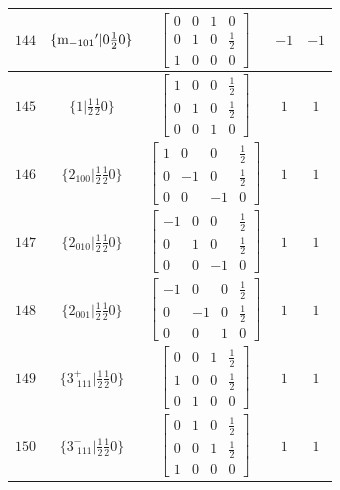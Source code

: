 \documentclass[fleqn,8pt]{jsarticle}
\begin{document}
\begin{longtable}{ccccc}
$ 144 $ & $ \{{\rm m}_{-101}{}'|0 \frac{1}{2} 0\} $ & $ \begin{bmatrix} 0 & 0 & 1 & 0 \\ 0 & 1 & 0 & \frac{1}{2} \\ 1 & 0 & 0 & 0 \end{bmatrix} $ & $ -1 $ & $ -1 $ \\ \hline
$ 145 $ & $ \{1|\frac{1}{2} \frac{1}{2} 0\} $ & $ \begin{bmatrix} 1 & 0 & 0 & \frac{1}{2} \\ 0 & 1 & 0 & \frac{1}{2} \\ 0 & 0 & 1 & 0 \end{bmatrix} $ & $ 1 $ & $ 1 $ \\ \hline
$ 146 $ & $ \{2{}_{100}|\frac{1}{2} \frac{1}{2} 0\} $ & $ \begin{bmatrix} 1 & 0 & 0 & \frac{1}{2} \\ 0 & -1 & 0 & \frac{1}{2} \\ 0 & 0 & -1 & 0 \end{bmatrix} $ & $ 1 $ & $ 1 $ \\ \hline
$ 147 $ & $ \{2{}_{010}|\frac{1}{2} \frac{1}{2} 0\} $ & $ \begin{bmatrix} -1 & 0 & 0 & \frac{1}{2} \\ 0 & 1 & 0 & \frac{1}{2} \\ 0 & 0 & -1 & 0 \end{bmatrix} $ & $ 1 $ & $ 1 $ \\ \hline
$ 148 $ & $ \{2{}_{001}|\frac{1}{2} \frac{1}{2} 0\} $ & $ \begin{bmatrix} -1 & 0 & 0 & \frac{1}{2} \\ 0 & -1 & 0 & \frac{1}{2} \\ 0 & 0 & 1 & 0 \end{bmatrix} $ & $ 1 $ & $ 1 $ \\ \hline
$ 149 $ & $ \{3^{+}_{\,\,111}|\frac{1}{2} \frac{1}{2} 0\} $ & $ \begin{bmatrix} 0 & 0 & 1 & \frac{1}{2} \\ 1 & 0 & 0 & \frac{1}{2} \\ 0 & 1 & 0 & 0 \end{bmatrix} $ & $ 1 $ & $ 1 $ \\ \hline
$ 150 $ & $ \{3^{-}_{\,\,111}|\frac{1}{2} \frac{1}{2} 0\} $ & $ \begin{bmatrix} 0 & 1 & 0 & \frac{1}{2} \\ 0 & 0 & 1 & \frac{1}{2} \\ 1 & 0 & 0 & 0 \end{bmatrix} $ & $ 1 $ & $ 1 $ \\ \hline

\end{longtable}
\end{document}
